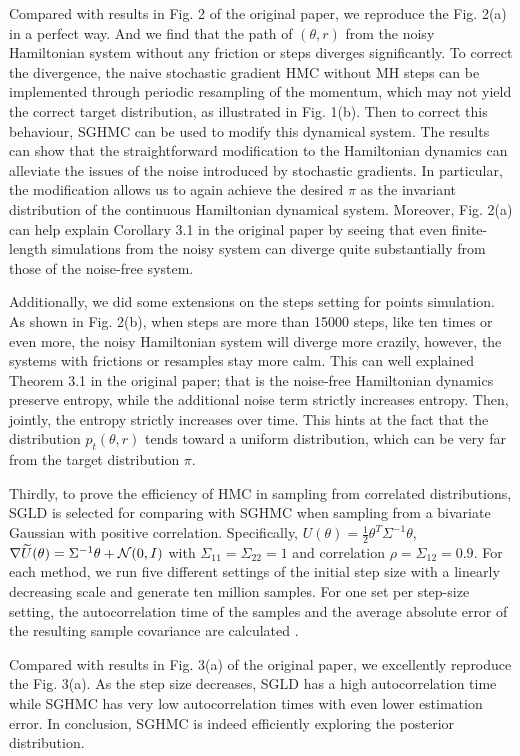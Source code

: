 Compared with results in Fig. 2 of the original paper, we reproduce the Fig. 2(a) in a perfect way. And we find that the path of $(\theta,r)$ from the noisy Hamiltonian system without any friction or steps diverges significantly. To correct the divergence, the naive stochastic gradient HMC without MH steps can be implemented through periodic resampling of the momentum, which may not yield the correct target distribution, as illustrated in Fig. 1(b). Then to correct this behaviour, SGHMC can be used to modify this dynamical system. The results can show that the straightforward modification to the Hamiltonian dynamics can alleviate the issues of the noise introduced by stochastic gradients. In particular, the modification allows us to again achieve the desired $\pi$ as the invariant distribution of the continuous Hamiltonian dynamical system. Moreover, Fig. 2(a) can help explain Corollary 3.1 in the original paper by seeing that even finite-length simulations from the noisy system can diverge quite substantially from those of the noise-free system.

Additionally, we did some extensions on the steps setting for points simulation. As shown in Fig. 2(b), when steps are more than 15000 steps, like ten times or even more, the noisy Hamiltonian system will diverge more crazily, however, the systems with frictions or resamples stay more calm. This can well explained Theorem 3.1 in the original paper; that is the noise-free Hamiltonian dynamics preserve entropy, while the additional noise term strictly increases entropy. Then, jointly, the entropy strictly increases over time. This hints at the fact that the distribution $p_t(\theta,r)$ tends toward a uniform distribution, which can be very far from the target distribution $\pi$. 

Thirdly, to prove the efficiency of HMC in sampling from correlated distributions, SGLD \cite{sgld} is selected for comparing with SGHMC when sampling from a bivariate Gaussian with positive correlation. Specifically, $U(\theta)=\frac{1}{2}\theta^T\Sigma^{-1}\theta$, 
$\nabla \widetilde{U}(\theta) = \Sigma^{-1}\theta + \mathcal{N}(0,I)$ with $\Sigma_{11} = \Sigma_{22} = 1$ and correlation $\rho = \Sigma_{12} = 0.9$.  For each method, we run five different settings of the initial step size with a linearly decreasing scale and generate ten million samples. For one set per step-size setting, the autocorrelation time of the samples and the average absolute error of the resulting sample covariance are calculated . 

Compared with results in Fig. 3(a) of the original paper, we excellently reproduce the Fig. 3(a). 
As the step size decreases, SGLD has a high autocorrelation time while SGHMC has very low autocorrelation times with even lower estimation error. In conclusion, SGHMC is indeed efficiently exploring the posterior distribution. 

